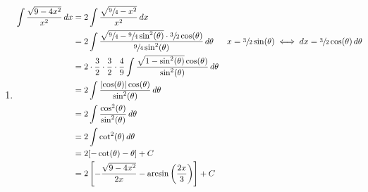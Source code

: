 \begin{Example}{}{}
    \begin{enumerate}[label=(\roman*)]
        \item \begin{align*}
                  \int \frac{\sqrt{9-4x^2}}{x^2} \, d{x}
                                                                                     & =2 \int \frac{\sqrt{\sfrac{9}{4}-x^2}}{x^2} \, d{x}                                                              \\
                                                                                     & =2 \int \frac{\sqrt{\sfrac{9}{4}-\sfrac{9}{4}\sin^2(\theta)}\cdot
                  \sfrac{3}{2}\cos(\theta)}{\sfrac{9}{4}\sin^2(\theta)} \, d{\theta} &                                                                                 & x=\sfrac{3}{2}\sin(\theta)\iff
                  dx=\sfrac{3}{2}\cos(\theta)\,d\theta                                                                                                                                                  \\
                                                                                     & =2\cdot \frac{3}{2} \cdot \frac{3}{2} \cdot \frac{4}{9}
                  \int \frac{\sqrt{1-\sin^2(\theta)}\cos(\theta)}{\sin^2(\theta)} \, d{\theta}                                                                                                          \\
                                                                                     & =2 \int \frac{\abs{\cos(\theta)}\cos(\theta)}{\sin^2(\theta)} \, d{\theta}                                       \\
                                                                                     & =2 \int \frac{\cos^2(\theta)}{\sin^2(\theta)} \, d{\theta}                                                       \\
                                                                                     & =2 \int \cot^2(\theta)\, d{\theta}                                                                               \\
                                                                                     & =2[-\cot(\theta)-\theta]+C                                                                                       \\
                                                                                     & =2\left[ -\frac{\sqrt{9-4x^2}}{2x}-\arcsin\left( \frac{2x}{3} \right) \right]+C

\end{align*}
\end{enumerate}
\end{Example}
